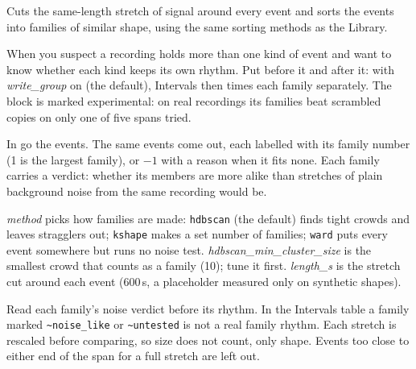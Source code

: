 Cuts the same-length stretch of signal around every event and sorts the events into families
of similar shape, using the same sorting methods as the Library.

When you suspect a recording holds more than one kind of event and want to know whether each
kind keeps its own rhythm. Put  before it and
 after it: with \emph{write\_group} on (the default),
Intervals then times each family separately. The block is marked experimental: on real
recordings its families beat scrambled copies on only one of five spans tried.

In go the events. The same events come out, each labelled with its family number (1 is the
largest family), or $-1$ with a reason when it fits none. Each family carries a verdict:
whether its members are more alike than stretches of plain background noise from the same
recording would be.

\emph{method} picks how families are made: \texttt{hdbscan} (the default) finds tight
crowds and leaves stragglers out; \texttt{kshape} makes a set number of families;
\texttt{ward} puts every event somewhere but runs no noise test.
\emph{hdbscan\_min\_cluster\_size} is the smallest crowd that counts as a family (10); tune
it first. \emph{length\_s} is the stretch cut around each event (600\,s, a placeholder
measured only on synthetic shapes).

Read each family's noise verdict before its rhythm. In the Intervals table a family marked
\texttt{\textasciitilde noise\_like} or \texttt{\textasciitilde untested} is not a real
family rhythm. Each stretch is rescaled before comparing, so size does not count, only
shape. Events too close to either end of the span for a full stretch are left out.

